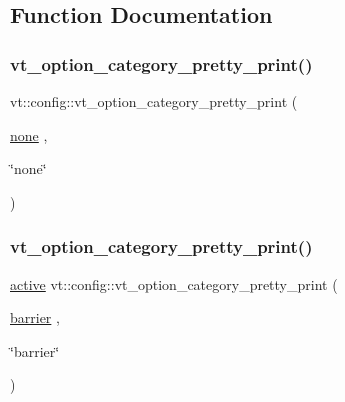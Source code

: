 \subsection{Function Documentation}
\mbox{\label{namespacevt_1_1config_a449841f4d156e80bd15d6c6fdfa78790}} 
\subsubsection{\texorpdfstring{vt\+\_\+option\+\_\+category\+\_\+pretty\+\_\+print()}{vt\_option\_category\_pretty\_print()}\hspace{0.1cm}{\footnotesize\ttfamily [1/17]}}
{\footnotesize\ttfamily vt\+::config\+::vt\+\_\+option\+\_\+category\+\_\+pretty\+\_\+print (\begin{DoxyParamCaption}\item[{\hyperlink{namespacevt_1_1config_a6bd1d6215bda0d8ca02811798399f689a58436a9330bb7d9e28934e496ce96bfe}{none}}]{,  }\item[{\char`\"{}none\char`\"{}}]{ }\end{DoxyParamCaption})}

\mbox{\label{namespacevt_1_1config_a089a9240dd41790f1dc100673b4ec409}} 
\subsubsection{\texorpdfstring{vt\+\_\+option\+\_\+category\+\_\+pretty\+\_\+print()}{vt\_option\_category\_pretty\_print()}\hspace{0.1cm}{\footnotesize\ttfamily [2/17]}}
{\footnotesize\ttfamily \hyperlink{namespacevt_1_1config_a6bd1d6215bda0d8ca02811798399f689a82f77c67af0c363709010c6df4dbd920}{active} vt\+::config\+::vt\+\_\+option\+\_\+category\+\_\+pretty\+\_\+print (\begin{DoxyParamCaption}\item[{\hyperlink{namespacevt_1_1config_a6bd1d6215bda0d8ca02811798399f689a39d4d58fa73c76f6cb97e6dc20e0d1c0}{barrier}}]{,  }\item[{\char`\"{}barrier\char`\"{}}]{ }\end{DoxyParamCaption})}

